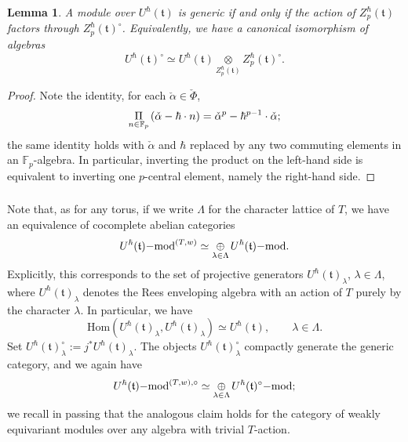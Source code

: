 \documentclass{amsart}
\newtheorem{Lem}[Thm]{Lemma}
\theoremstyle{definition}
\newcommand{\halpha}{\check{\alpha}}
\newcommand{\lmod}{\on{-mod}}
\newcommand{\sss}{\subsubsection{}}
\newcommand{\ft}{\mathfrak{t}}
\newcommand{\on}{\mathrm}
\numberwithin{equation}{section}
\begin{document}
\begin{Lem}\label{l:genpcent} A module over $U^\hbar(\ft)$ is generic if and only if the action of $Z_p^\hbar(\ft)$ factors through $Z_p^\hbar(\ft)^\circ$. Equivalently, we have a canonical isomorphism of algebras
$$U^\hbar(\ft)^\circ \simeq U^\hbar(\ft) \underset{Z^\hbar_p(\ft)} \otimes Z^\hbar_p(\ft)^\circ.$$
\end{Lem}

\begin{proof} Note the identity, for each $\halpha \in \check{\Phi}$, 
$$\underset{n \in \mathbb{F}_p}\Pi \hspace{.5mm} (\halpha - \hbar \cdot n) = \halpha^p - \hbar^{p-1} \cdot \halpha;$$
the same identity holds with $\halpha$ and $\hbar$ replaced by any two commuting elements in an $\mathbb{F}_p$-algebra. In particular, inverting the product on the left-hand side is equivalent to inverting one $p$-central element, namely the right-hand side. 
\end{proof}




\sss Note that, as for any torus, if we write $\Lambda$ for the character lattice of $T$, we have an equivalence of cocomplete abelian categories$$U^\hbar(\ft)\lmod^{(T,w)}  \simeq \underset{\lambda \in \Lambda}\oplus \hspace{.5mm} U^\hbar(\ft)\lmod.$$
Explicitly, this corresponds to the set of projective generators $U^\hbar(\ft)_\lambda$, $\lambda \in \Lambda$, where $U^\hbar(\ft)_\lambda$ denotes the Rees enveloping algebra with an action of $T$ purely by the character $\lambda$. In particular, we have
$$\on{Hom}(U^\hbar(\ft)_\lambda, U^\hbar(\ft)_\lambda) \simeq U^\hbar(\ft), \quad \quad \lambda \in \Lambda.$$
Set $U^\hbar(\ft)^\circ_\lambda := j^* U^\hbar(\ft)_\lambda$. The objects $U^\hbar(\ft)^\circ_\lambda$ compactly generate the generic category, and we again have 
$$U^\hbar(\ft)\lmod^{(T,w), \circ} \simeq  \underset{\lambda \in \Lambda}\oplus \hspace{.5mm} U^\hbar(\ft)^\circ\lmod;$$
we recall in passing that the analogous claim holds for the category of weakly equivariant modules over any algebra with trivial $T$-action.
\end{document}

